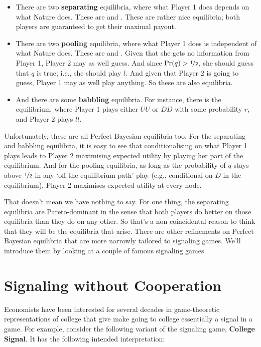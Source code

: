 \documentclass[openany]{book}
\newcommand{\eqm}{equilibrium}
\begin{document}
\begin{itemize}
\item There are two \textbf{separating} equilibria, where what Player 1 does depends on what Nature does. These are  and . These are rather nice equilibria; both players are guaranteed to get their maximal payout.
\item There are two \textbf{pooling} equilibria, where what Player 1 does is independent of what Nature does. These are  and . Given that she gets no information from Player 1, Player 2 may as well guess. And since $\Pr(q) > \nicefrac{1}{2}$, she should guess that $q$ is true; i.e., she should play $l$. And given that Player 2 is going to guess, Player 1 may as well play anything. So these are also equilibria.
\item And there are some \textbf{babbling} equilibria. For instance, there is the \eqm\ where Player 1 plays either $UU$ or $DD$ with some probability $r$, and Player 2 plays $ll$.
\end{itemize}
Unfortunately, these are all Perfect Bayesian equilibria too. For the separating and babbling equilibria, it is easy to see that conditionalising on what Player 1 plays leads to Player 2 maximising expected utility by playing her part of the \eqm. And for the pooling equilibria, as long as the probability of $q$ stays above $\nicefrac{1}{2}$ in any `off-the-\eqm-path' play (e.g., conditional on $D$ in the  \eqm), Player 2 maximises expected utility at every node.

That doesn't mean we have nothing to say. For one thing, the separating equilibria are Pareto-dominant in the sense that both players do better on those equilibria than they do on any other. So that's a non-coincidental reason to think that they will be the equilibria that arise. There are other refinements on Perfect Bayesian equilibria that are more narrowly tailored to signaling games. We'll introduce them by looking at a couple of famous signaling games.

\section{Signaling without Cooperation}

Economists have been interested for several decades in game-theoretic representations of college that give make going to college essentially a signal in a game. For example, consider the following variant of the signaling game, \textbf{College Signal}. It has the following intended interpretation:
\end{document}
